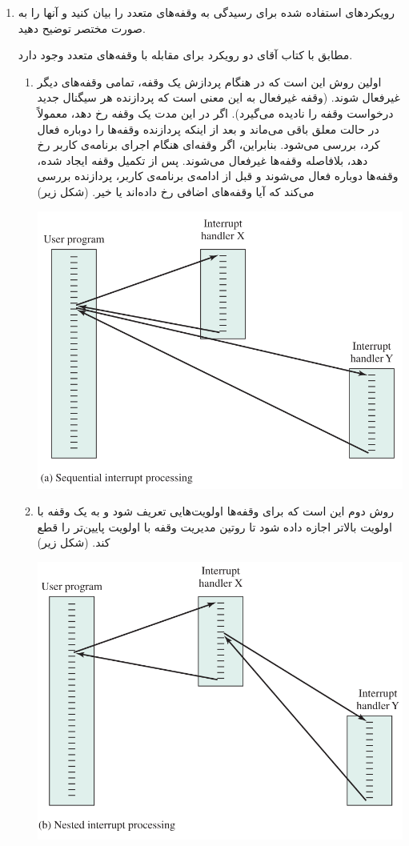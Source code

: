 \begin{enumerate}
\begin{qsolve}
	\end{qsolve}
	
	
	\item 
	رویکردهای استفاده شده برای رسیدگی به وقفه‌های متعدد را بیان کنید و آنها را به صورت مختصر توضیح دهید.
	\begin{qsolve}
		مطابق با کتاب آقای  دو رویکرد برای مقابله با وقفه‌های متعدد وجود دارد.
		
		\begin{enumerate}
			\item 
			اولین روش این است که در هنگام پردازش یک وقفه، تمامی وقفه‌های دیگر غیرفعال شوند. (وقفه غیرفعال به این معنی است که پردازنده هر سیگنال جدید درخواست وقفه را نادیده می‌گیرد). اگر در این مدت یک وقفه رخ دهد، معمولاً در حالت معلق باقی می‌ماند و بعد از اینکه پردازنده وقفه‌ها را دوباره فعال کرد، بررسی می‌شود. بنابراین، اگر وقفه‌ای هنگام اجرای برنامه‌ی کاربر رخ دهد، بلافاصله وقفه‌ها غیرفعال می‌شوند. پس از تکمیل  وقفه ایجاد شده، وقفه‌ها دوباره فعال می‌شوند و قبل از ادامه‌ی برنامه‌ی کاربر، پردازنده بررسی می‌کند که آیا وقفه‌های اضافی رخ داده‌اند یا خیر. (شکل زیر)
			
			\begin{center}
				\includegraphics*[width=0.6\linewidth]{pics/img2.png}
			\end{center}
			
			\item 
			روش دوم این است که برای وقفه‌ها اولویت‌هایی تعریف شود و به یک وقفه با اولویت بالاتر اجازه داده شود تا روتین مدیریت وقفه با اولویت پایین‌تر را قطع کند. (شکل زیر)
			
			\begin{center}
				\includegraphics*[width=0.6\linewidth]{pics/img3.png}
			\end{center}
			

\end{enumerate}
\end{qsolve}
\end{enumerate}

